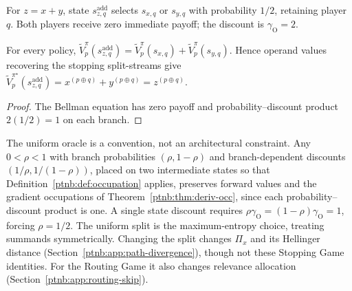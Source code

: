 \begin{definition}\label{ptnb:def:addition-subgame}
For $z=x+y$, state $s_{z,q}^{\mathrm{add}}$ selects $s_{x,q}$ or $s_{y,q}$ with probability
$1/2$, retaining player $q$. Both players receive zero immediate payoff; the discount is
$\gamma_{\mathrm O}=2$.
\end{definition}
\begin{proposition}\label{ptnb:prop:addition-equivalence}
For every policy,
$\tilde V_p^\pi(s_{z,q}^{\mathrm{add}})=\tilde V_p^\pi(s_{x,q})+\tilde V_p^\pi(s_{y,q})$.
Hence operand values recovering the stopping split-streams give
$\tilde V_p^{\pi^\star}(s_{z,q}^{\mathrm{add}})=x^{(p\oplus q)}+y^{(p\oplus q)}=z^{(p\oplus q)}$.
\end{proposition}
\begin{proof}
The Bellman equation has zero payoff and probability--discount product $2(1/2)=1$ on each branch.
\end{proof}

The uniform oracle is a convention, not an architectural constraint. Any $0<\rho<1$ with branch
probabilities $(\rho,1-\rho)$ and branch-dependent discounts $(1/\rho,1/(1-\rho))$, placed on two intermediate states so that Definition~\ref{ptnb:def:occupation} applies, preserves
forward values and the gradient occupations of Theorem~\ref{ptnb:thm:deriv-occ}, since each
probability--discount product is one. A single state discount requires
$\rho\gamma_{\mathrm O}=(1-\rho)\gamma_{\mathrm O}=1$, forcing $\rho=1/2$.
The uniform split is the maximum-entropy choice, treating summands symmetrically. Changing the split changes
$\Pi_x$ and its Hellinger distance (Section~\ref{ptnb:app:path-divergence}), though not these
Stopping Game identities. For the Routing Game it also changes relevance allocation
(Section~\ref{ptnb:app:routing-skip}).

